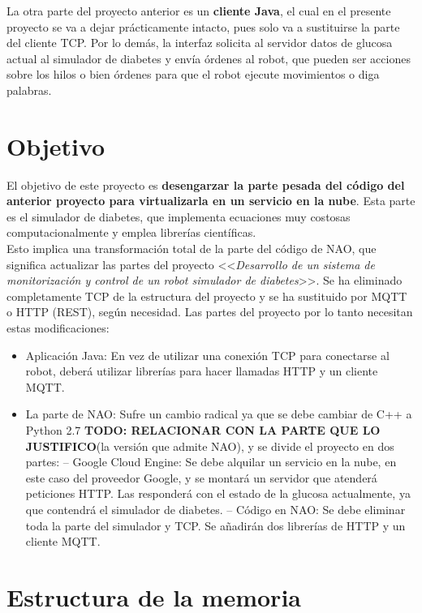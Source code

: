 \documentclass[12pt,spanish,listoffigures,listoftables]{tfgetsinf}
\begin{document}
La otra parte del proyecto anterior es un \textbf{cliente Java}, el cual en el presente proyecto se va a dejar prácticamente intacto, pues solo va a sustituirse la parte del cliente TCP. Por lo demás, la interfaz solicita al servidor datos de glucosa actual al simulador de diabetes y envía órdenes al robot, que pueden ser acciones sobre los hilos o bien órdenes para que el robot ejecute movimientos o diga palabras.

\section{Objetivo}

El objetivo de este proyecto es \textbf{desengarzar la parte pesada del código del anterior proyecto para virtualizarla en un servicio en la nube}. Esta parte es el simulador de diabetes, que implementa ecuaciones muy costosas computacionalmente y emplea librerías científicas. \\

Esto implica una transformación total de la parte del código de NAO, que significa actualizar las partes del proyecto <<\textit{Desarrollo de un sistema de monitorización y control de un robot simulador de diabetes}>>. Se ha eliminado completamente TCP de la estructura del proyecto y se ha sustituido por MQTT o HTTP (REST), según necesidad. Las partes del proyecto por lo tanto necesitan estas modificaciones: 
\begin{itemize}
	\item Aplicación Java: En vez de utilizar una conexión TCP para conectarse al robot, deberá utilizar librerías para hacer llamadas HTTP y un cliente MQTT. 
	\item La parte de NAO: Sufre un cambio radical ya que se debe cambiar de C++ a Python 2.7 \textbf{TODO: RELACIONAR CON LA PARTE QUE LO JUSTIFICO}(la versión que admite NAO), y se divide el proyecto en dos partes:
		\subitem -- Google Cloud Engine: Se debe alquilar un servicio en la nube, en este caso del proveedor Google, y se montará un servidor que atenderá peticiones HTTP. Las responderá con el estado de la glucosa actualmente, ya que contendrá el simulador de diabetes.
		\subitem -- Código en NAO: Se debe eliminar toda la parte del simulador y TCP. Se añadirán dos librerías de HTTP y un cliente MQTT. 
\end{itemize}

\section{Estructura de la memoria}
\end{document}
